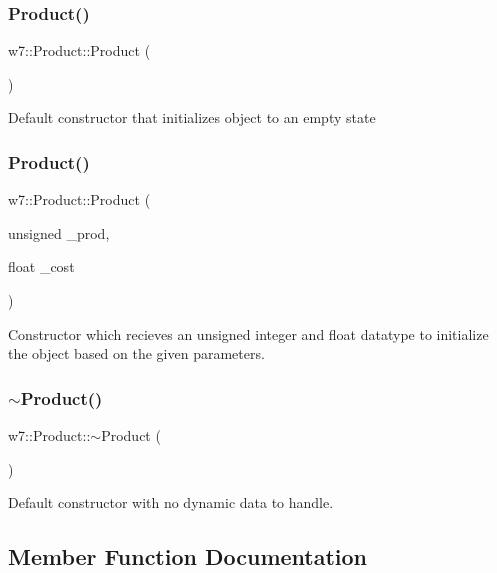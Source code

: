 \subsubsection{\texorpdfstring{Product()}{Product()}\hspace{0.1cm}{\footnotesize\ttfamily [1/2]}}
{\footnotesize\ttfamily w7\+::\+Product\+::\+Product (\begin{DoxyParamCaption}{ }\end{DoxyParamCaption})}

Default constructor that initializes object to an empty state \mbox{\label{classw7_1_1Product_aa5d91c860fae799ab80865c41508fd59}} 
\subsubsection{\texorpdfstring{Product()}{Product()}\hspace{0.1cm}{\footnotesize\ttfamily [2/2]}}
{\footnotesize\ttfamily w7\+::\+Product\+::\+Product (\begin{DoxyParamCaption}\item[{unsigned}]{\+\_\+prod,  }\item[{float}]{\+\_\+cost }\end{DoxyParamCaption})}

Constructor which recieves an unsigned integer and float datatype to initialize the object based on the given parameters. \mbox{\label{classw7_1_1Product_adeb7d71bf940bb585977fe07a772190b}} 
\subsubsection{\texorpdfstring{$\sim$\+Product()}{~Product()}}
{\footnotesize\ttfamily w7\+::\+Product\+::$\sim$\+Product (\begin{DoxyParamCaption}{ }\end{DoxyParamCaption})}

Default constructor with no dynamic data to handle. 

\subsection{Member Function Documentation}
\mbox{\label{classw7_1_1Product_a60b146f19a712d3eadd1b93a48c54e7d}} 
